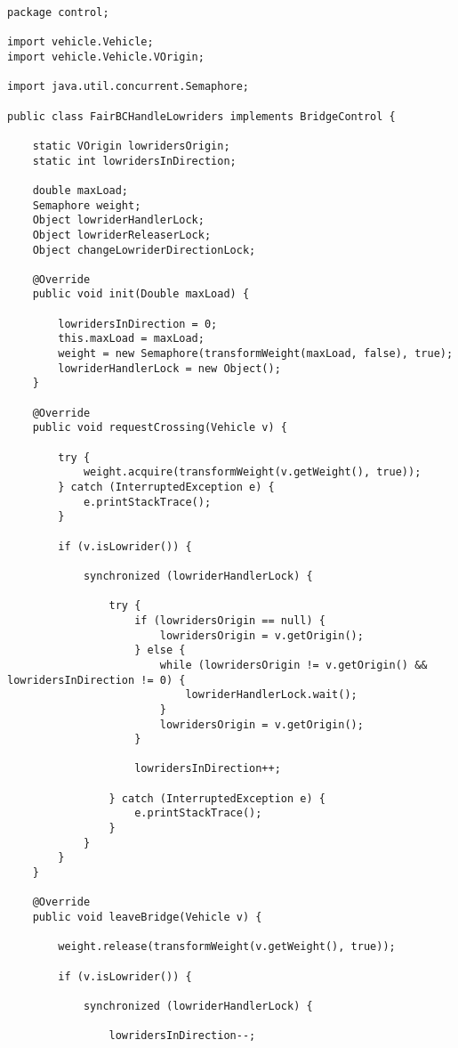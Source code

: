\begin{itemize}
\begin{lstlisting}[style=java]
package control;

import vehicle.Vehicle;
import vehicle.Vehicle.VOrigin;

import java.util.concurrent.Semaphore;

public class FairBCHandleLowriders implements BridgeControl {

    static VOrigin lowridersOrigin;
    static int lowridersInDirection;

    double maxLoad;
    Semaphore weight;
    Object lowriderHandlerLock;
    Object lowriderReleaserLock;
    Object changeLowriderDirectionLock;

    @Override
    public void init(Double maxLoad) {

        lowridersInDirection = 0;
        this.maxLoad = maxLoad;
        weight = new Semaphore(transformWeight(maxLoad, false), true);
        lowriderHandlerLock = new Object();
    }

    @Override
    public void requestCrossing(Vehicle v) {

        try {
            weight.acquire(transformWeight(v.getWeight(), true));
        } catch (InterruptedException e) {
            e.printStackTrace();
        }

        if (v.isLowrider()) {

            synchronized (lowriderHandlerLock) {

                try {
                    if (lowridersOrigin == null) {
                        lowridersOrigin = v.getOrigin();
                    } else {
                        while (lowridersOrigin != v.getOrigin() && lowridersInDirection != 0) {
                            lowriderHandlerLock.wait();
                        }
                        lowridersOrigin = v.getOrigin();
                    }

                    lowridersInDirection++;

                } catch (InterruptedException e) {
                    e.printStackTrace();
                }
            }
        }
    }

    @Override
    public void leaveBridge(Vehicle v) {

        weight.release(transformWeight(v.getWeight(), true));

        if (v.isLowrider()) {

            synchronized (lowriderHandlerLock) {

                lowridersInDirection--;


\end{lstlisting}
\end{itemize}
